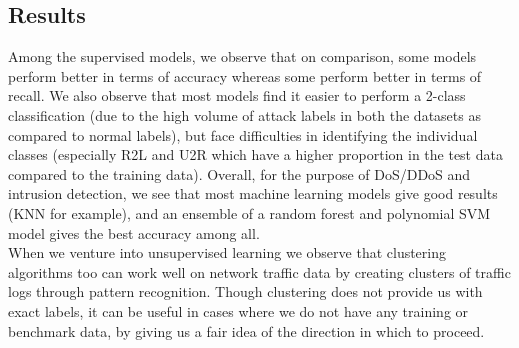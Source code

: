 \subsection{Results}
Among the supervised models, we observe that on comparison, some models perform better in terms of accuracy whereas some perform better in terms of recall. We also observe that most models find it easier to perform a 2-class classification (due to the high volume of attack labels in both the datasets as compared to normal labels), but face difficulties in identifying the individual classes (especially R2L and U2R which have a higher proportion in the test data compared to the training data). Overall, for the purpose of DoS/DDoS and intrusion detection, we see that most machine learning models give good results (KNN for example), and an ensemble of a random forest and polynomial SVM model gives the best accuracy among all.\\
When we venture into unsupervised learning we observe that clustering algorithms too can work well on network traffic data by creating clusters of traffic logs through pattern recognition. Though clustering does not provide us with exact labels, it can be useful in cases where we do not have any training or benchmark data, by giving us a fair idea of the direction in which to proceed.

